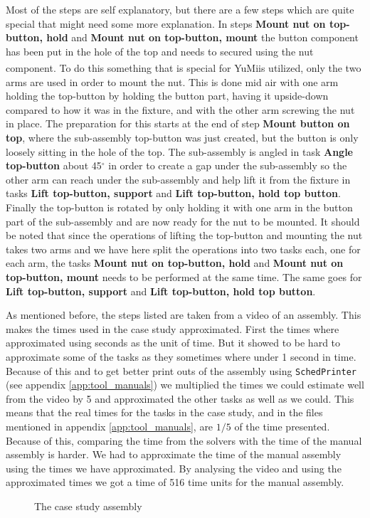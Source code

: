 \noindent Most of the steps are self explanatory, but there are a few steps which are quite special that might need some more explanation. In steps \textbf{Mount nut on top-button, hold} and \textbf{Mount nut on top-button, mount} the button component has been put in the hole of the top and needs to secured using the nut component. To do this something that is special for YuMi\textsuperscript\textregistered is utilized, only the two arms are used in order to mount the nut. This is done mid air with one arm holding the top-button by holding the button part, having it upside-down compared to how it was in the fixture, and with the other arm screwing the nut in place. The preparation for this starts at the end of step \textbf{Mount button on top}, where the sub-assembly top-button was just created, but the button is only loosely sitting in the hole of the top. The sub-assembly is angled in task \textbf{Angle top-button} about 45$^\circ$ in order to create a gap under the sub-assembly so the other arm can reach under the sub-assembly and help lift it from the fixture in tasks \textbf{Lift top-button, support} and \textbf{Lift top-button, hold top button}. Finally the top-button is rotated by only holding it with one arm in the button part of the sub-assembly and are now ready for the nut to be mounted.
It should be noted that since the operations of lifting the top-button and mounting the nut takes two arms and we have here split the operations into two tasks each, one for each arm, the tasks \textbf{Mount nut on top-button, hold} and \textbf{Mount nut on top-button, mount} needs to be performed at the same time. The same goes for  \textbf{Lift top-button, support} and \textbf{Lift top-button, hold top button}.

As mentioned before, the steps listed are taken from a video of an assembly. This makes the times used in the case study approximated. First the times where approximated using seconds as the unit of time. But it showed to be hard to approximate some of the tasks as they sometimes where under 1 second in time. Because of this and to get better print outs of the assembly using \texttt{SchedPrinter} (see appendix \ref{app:tool_manuals}) we multiplied the times we could estimate well from the video by 5 and approximated the other tasks as well as we could. This means that the real times for the tasks in the case study, and in the files mentioned in appendix \ref{app:tool_manuals}, are $1/5$ of the time presented. Because of this, comparing the time from the solvers with the time of the manual assembly is harder. We had to approximate the time of the manual assembly using the times we have approximated. By analysing the video and using the approximated times we got a time of 516 time units for the manual assembly.

\begin{landscape}
\begin{figure}

\caption{The case study assembly}
\label{fig:assembly}
\end{figure}
\end{landscape}

%